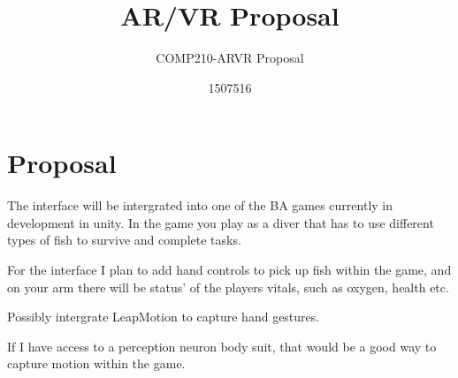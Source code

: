 \documentclass{scrartcl}
\title{AR/VR Proposal }
\subtitle{COMP210-ARVR Proposal}
\author{1507516}
\begin{document}
\maketitle

\section{Proposal}

The interface will be intergrated into one of the BA games currently in development in unity. 
In the game you play as a diver that has to use different types of fish to survive and complete tasks.

For the interface I plan to add hand controls to pick up fish within the game, and on your arm there will be status' of the players vitals, such as oxygen, health etc.

Possibly intergrate LeapMotion to capture hand gestures.

If I have access to a perception neuron body suit, that would be a good way to capture motion within the game.
\end{document}
